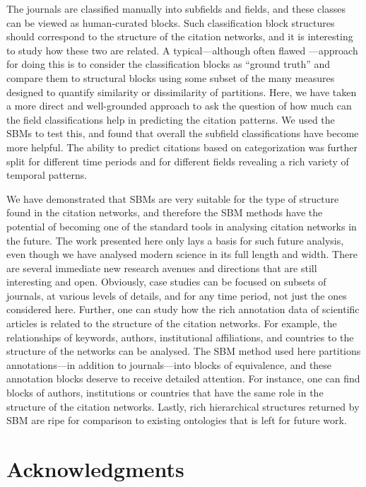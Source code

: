 \documentclass[a4paper,12pt]{article}
\begin{document}
The journals are classified manually into subfields and fields, and these classes can be viewed as human-curated blocks. 
 Such  classification block structures should correspond to the structure of the citation networks, and it is interesting to study how these two are related. 
 A typical---although often flawed \citep{Hric2014}---approach for doing this is to consider the classification blocks as ``ground truth'' and compare them to structural blocks using some subset of the many measures  designed to quantify similarity or dissimilarity of partitions.
Here, we have taken a more direct and well-grounded approach to ask the question of how much can the field classifications help in predicting the 
citation patterns. We used the SBMs to test this, and found that overall the subfield classifications have become more helpful.
The ability to predict citations based on categorization was further split for different time periods and for different fields revealing 
a rich variety of temporal patterns.

We have demonstrated that SBMs are very suitable for the type of structure found in the citation networks, 
and therefore the SBM methods have the potential of becoming one of the standard tools in analysing citation networks in the future. 
The work presented here only lays a basis for such future analysis, even though we have analysed modern science in its full length and width.
There are  several immediate new research avenues and directions that are still interesting and open. 
Obviously, case studies can be focused on subsets of journals, at various levels of details, and for any time period, not just the ones considered here. 
Further, one can study how the rich annotation data of scientific
articles is related to the structure of the citation networks. For example, the relationships of keywords, authors, institutional affiliations, and countries 
to the structure of the networks can be analysed. The SBM method used here partitions annotations---in addition to journals---into blocks of equivalence, and these annotation blocks 
deserve to receive detailed attention.
For instance, one can find blocks of authors, institutions or countries that have the same role in the structure of the citation networks.
Lastly, rich hierarchical structures returned by SBM are ripe for comparison to existing ontologies that is left for future work.


\section{Acknowledgments}
\label{sec:acknowledgments}
\end{document}
